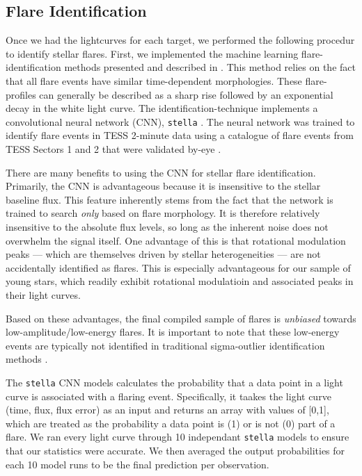 \documentclass[twocolumn]{aastex631}
\begin{document}
\subsection{Flare Identification}\label{subsec2:Flareidentification}

Once we had the lightcurves for each target, we performed the following procedur to identify stellar flares. First, we implemented the machine learning flare-identification methods presented and described in
\cite{feinstein20}. This method relies on the fact that all flare events
have similar time-dependent morphologies. These flare-profiles can generally be described as a sharp rise followed by
 an exponential decay in the white light curve. The identification-technique implements  a convolutional neural network (CNN),
\texttt{stella} \citep{feinstein20}. The neural network was trained to identify flare events in TESS 2-minute data using a catalogue of flare events from
TESS Sectors 1 and 2 that were validated  by-eye
\citep{guenther19_flares}.

There are many benefits to using the CNN for stellar flare identification. Primarily, the CNN is advantageous because it is insensitive to the stellar baseline flux. This feature inherently stems from the fact that the network is trained to search \textit{only} based on flare morphology. It is therefore relatively insensitive to the absolute flux levels, so long as the inherent noise does not overwhelm the signal itself. One advantage of this is that rotational modulation peaks --- which are themselves  driven by
stellar heterogeneities ---
are not accidentally identified as flares. This is especially advantageous for our sample of young stars, which  readily exhibit rotational modulatioin and associated peaks  in their light curves.

Based on these advantages, the final compiled sample of flares is \textit{unbiased} towards low-amplitude/low-energy flares. It is important to note that these low-energy events are typically  not identified in traditional sigma-outlier identification
methods \citep{chang15}.

The \texttt{stella} CNN models calculates the probability that a data point in a light curve is associated with a flaring event. Specifically, it taakes the light curve (time, flux, flux error)
as an input and returns an array with values of [0,1], which are treated as
the probability a data point is (1) or is not (0) part of a flare. We ran every
light curve through 10 independant \texttt{stella} models to ensure that our statistics were accurate. We then averaged the output probabilities for each 10 model runs to be the final prediction per observation.
\end{document}
